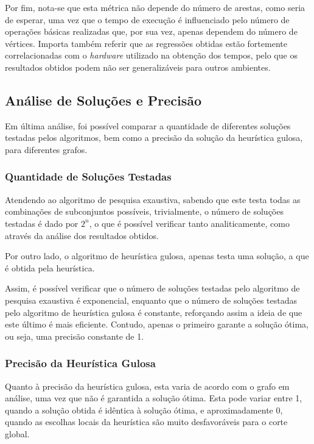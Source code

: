 \documentclass[mirror, portugues]{revdetua}
\begin{document}
Por fim, nota-se que esta métrica não depende do número de arestas, como seria de esperar, uma vez que o tempo de execução é influenciado pelo número de operações básicas realizadas que, por sua vez, apenas dependem do número de vértices. Importa também referir que as regressões obtidas estão fortemente correlacionadas com o \textit{hardware} utilizado na obtenção dos tempos, pelo que os resultados obtidos podem não ser generalizáveis para outros ambientes.

\subsection{Análise de Soluções e Precisão}

Em última análise, foi possível comparar a quantidade de diferentes soluções testadas pelos algoritmos, bem como a precisão da solução da heurística gulosa, para diferentes grafos.

\subsubsection{Quantidade de Soluções Testadas}

Atendendo ao algoritmo de pesquisa exaustiva, sabendo que este testa todas as combinações de subconjuntos possíveis, trivialmente, o número de soluções testadas é dado por $2^n$, o que é possível verificar tanto analiticamente, como através da análise dos resultados obtidos.

Por outro lado, o algoritmo de heurística gulosa, apenas testa uma solução, a que é obtida pela heurística.

Assim, é possível verificar que o número de soluções testadas pelo algoritmo de pesquisa exaustiva é exponencial, enquanto que o número de soluções testadas pelo algoritmo de heurística gulosa é constante, reforçando assim a ideia de que este último é mais eficiente. Contudo, apenas o primeiro garante a solução ótima, ou seja, uma precisão constante de 1.

\subsubsection{Precisão da Heurística Gulosa}

Quanto à precisão da heurística gulosa, esta varia de acordo com o grafo em análise, uma vez que não é garantida a solução ótima. Esta pode variar entre 1, quando a solução obtida é idêntica à solução ótima, e aproximadamente 0, quando as escolhas locais da heurística são muito desfavoráveis para o corte global.
\end{document}
